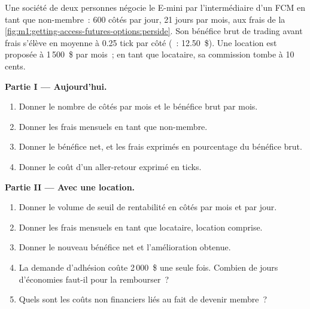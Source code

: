 \begin{problem}\label{pb:m1:getting-access-futures-options:1}
Une société de deux personnes négocie le E-mini par l'intermédiaire d'un FCM en tant que non-membre~: 600
côtés par jour, 21 jours par mois, aux frais de
la \cref{fig:m1:getting-access-futures-options:perside}. Son bénéfice brut de trading
avant frais s'élève en moyenne à 0.25 tick par côté (~: 12.50~\$). Une location est
proposée à 1\,500~\$ par mois~; en tant que locataire, sa commission tombe à 10 cents.

\medskip\noindent\textbf{Partie I --- Aujourd'hui.}
\begin{enumerate}
\item Donner le nombre de côtés par mois et le bénéfice brut par mois.
\item Donner les frais mensuels en tant que non-membre.
\item Donner le bénéfice net, et les frais exprimés en pourcentage du bénéfice brut.
\item Donner le coût d'un aller-retour exprimé en ticks.
\end{enumerate}

\medskip\noindent\textbf{Partie II --- Avec une location.}
\begin{enumerate}[resume]
\item Donner le volume de seuil de rentabilité en côtés par mois et par jour.
\item Donner les frais mensuels en tant que locataire, location comprise.
\item Donner le nouveau bénéfice net et l'amélioration obtenue.
\item La demande d'adhésion coûte 2\,000~\$ une seule fois. Combien de jours d'économies faut-il pour la rembourser~?
\item Quels sont les coûts non financiers liés au fait de devenir membre~?
\end{enumerate}


\end{problem}

